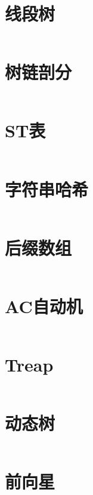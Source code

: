 \documentclass[titlepage,landscape,a4paper,10pt]{article}
\begin{document}
\begin{multicols}{2}
\begin{spacing}{0.8}
\section{线段树}
\inputminted{cpp}{/Users/Corn/Desktop/Code/ACM_SCL/code/segtree.cpp}

\section{树链剖分}
\inputminted{cpp}{/Users/Corn/Desktop/Code/ACM_SCL/code/decomposition.cpp}

\section{ST表}
\inputminted{cpp}{/Users/Corn/Desktop/Code/ACM_SCL/code/ST.cpp}

\section{字符串哈希}
\inputminted{cpp}{/Users/Corn/Desktop/Code/ACM_SCL/code/Rabin_Karp.cpp}

\section{后缀数组}
\inputminted{cpp}{/Users/Corn/Desktop/Code/ACM_SCL/code/suffix_array.cpp}

\section{AC自动机}
\inputminted{cpp}{/Users/Corn/Desktop/Code/ACM_SCL/code/AC_automaton.cpp}

\section{Treap}
\inputminted{cpp}{/Users/Corn/Desktop/Code/ACM_SCL/code/treap.cpp}

\section{动态树}
\inputminted{cpp}{/Users/Corn/Desktop/Code/ACM_SCL/code/LCT.cpp}


\section{前向星}
\inputminted{cpp}{/Users/Corn/Desktop/Code/ACM_SCL/code/Gra_base.cpp}


\end{spacing}
\end{multicols}
\end{document}
